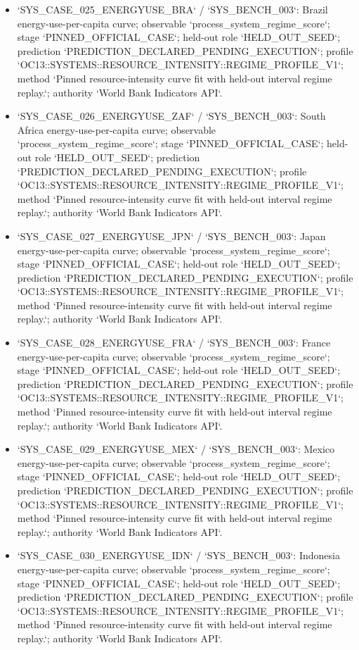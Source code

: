 \begin{itemize}
\item `SYS\_CASE\_025\_ENERGYUSE\_BRA` / `SYS\_BENCH\_003`: Brazil energy-use-per-capita curve; observable `process\_system\_regime\_score`; stage `PINNED\_OFFICIAL\_CASE`; held-out role `HELD\_OUT\_SEED`; prediction `PREDICTION\_DECLARED\_PENDING\_EXECUTION`; profile `OC13::SYSTEMS::RESOURCE\_INTENSITY::REGIME\_PROFILE\_V1`; method `Pinned resource-intensity curve fit with held-out interval regime replay.`; authority `World Bank Indicators API`.
\item `SYS\_CASE\_026\_ENERGYUSE\_ZAF` / `SYS\_BENCH\_003`: South Africa energy-use-per-capita curve; observable `process\_system\_regime\_score`; stage `PINNED\_OFFICIAL\_CASE`; held-out role `HELD\_OUT\_SEED`; prediction `PREDICTION\_DECLARED\_PENDING\_EXECUTION`; profile `OC13::SYSTEMS::RESOURCE\_INTENSITY::REGIME\_PROFILE\_V1`; method `Pinned resource-intensity curve fit with held-out interval regime replay.`; authority `World Bank Indicators API`.
\item `SYS\_CASE\_027\_ENERGYUSE\_JPN` / `SYS\_BENCH\_003`: Japan energy-use-per-capita curve; observable `process\_system\_regime\_score`; stage `PINNED\_OFFICIAL\_CASE`; held-out role `HELD\_OUT\_SEED`; prediction `PREDICTION\_DECLARED\_PENDING\_EXECUTION`; profile `OC13::SYSTEMS::RESOURCE\_INTENSITY::REGIME\_PROFILE\_V1`; method `Pinned resource-intensity curve fit with held-out interval regime replay.`; authority `World Bank Indicators API`.
\item `SYS\_CASE\_028\_ENERGYUSE\_FRA` / `SYS\_BENCH\_003`: France energy-use-per-capita curve; observable `process\_system\_regime\_score`; stage `PINNED\_OFFICIAL\_CASE`; held-out role `HELD\_OUT\_SEED`; prediction `PREDICTION\_DECLARED\_PENDING\_EXECUTION`; profile `OC13::SYSTEMS::RESOURCE\_INTENSITY::REGIME\_PROFILE\_V1`; method `Pinned resource-intensity curve fit with held-out interval regime replay.`; authority `World Bank Indicators API`.
\item `SYS\_CASE\_029\_ENERGYUSE\_MEX` / `SYS\_BENCH\_003`: Mexico energy-use-per-capita curve; observable `process\_system\_regime\_score`; stage `PINNED\_OFFICIAL\_CASE`; held-out role `HELD\_OUT\_SEED`; prediction `PREDICTION\_DECLARED\_PENDING\_EXECUTION`; profile `OC13::SYSTEMS::RESOURCE\_INTENSITY::REGIME\_PROFILE\_V1`; method `Pinned resource-intensity curve fit with held-out interval regime replay.`; authority `World Bank Indicators API`.
\item `SYS\_CASE\_030\_ENERGYUSE\_IDN` / `SYS\_BENCH\_003`: Indonesia energy-use-per-capita curve; observable `process\_system\_regime\_score`; stage `PINNED\_OFFICIAL\_CASE`; held-out role `HELD\_OUT\_SEED`; prediction `PREDICTION\_DECLARED\_PENDING\_EXECUTION`; profile `OC13::SYSTEMS::RESOURCE\_INTENSITY::REGIME\_PROFILE\_V1`; method `Pinned resource-intensity curve fit with held-out interval regime replay.`; authority `World Bank Indicators API`.
\end{itemize}
